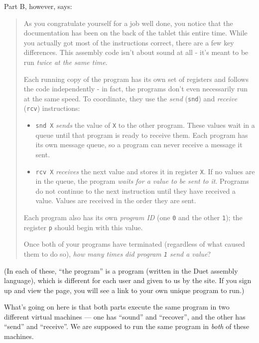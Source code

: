 \documentclass[]{article}
\begin{document}
Part B, however, says:

\begin{quote}
As you congratulate yourself for a job well done, you notice that the
documentation has been on the back of the tablet this entire time. While you
actually got most of the instructions correct, there are a few key differences.
This assembly code isn't about sound at all - it's meant to be run \emph{twice
at the same time}.

Each running copy of the program has its own set of registers and follows the
code independently - in fact, the programs don't even necessarily run at the
same speed. To coordinate, they use the \emph{send} (\texttt{snd}) and
\emph{receive} (\texttt{rcv}) instructions:

\begin{itemize}
\tightlist
\item
  \texttt{snd\ X} \emph{sends} the value of \texttt{X} to the other program.
  These values wait in a queue until that program is ready to receive them. Each
  program has its own message queue, so a program can never receive a message it
  sent.
\item
  \texttt{rcv\ X} \emph{receives} the next value and stores it in register
  \texttt{X}. If no values are in the queue, the program \emph{waits for a value
  to be sent to it}. Programs do not continue to the next instruction until they
  have received a value. Values are received in the order they are sent.
\end{itemize}

Each program also has its own \emph{program ID} (one \texttt{0} and the other
\texttt{1}); the register \texttt{p} should begin with this value.

Once both of your programs have terminated (regardless of what caused them to do
so), \emph{how many times did program \texttt{1} send a value}?
\end{quote}

(In each of these, ``the program'' is a program (written in the Duet assembly
language), which is different for each user and given to us by the site. If you
sign up and view the page, you will see a link to your own unique program to
run.)

What's going on here is that both parts execute the same program in two
different virtual machines --- one has ``sound'' and ``recover'', and the other
has ``send'' and ``receive''. We are supposed to run the same program in
\emph{both} of these machines.
\end{document}
